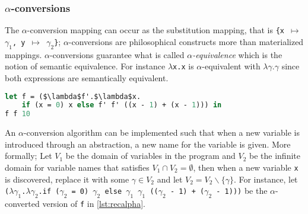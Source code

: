 \documentclass[11pt,oneside,a4paper]{report}
\begin{document}
\subsubsection{$\alpha$-conversions}
The $\alpha$-conversion mapping can occur as the substitution mapping, that is \texttt{\{x $\mapsto$ $\gamma_1$, y $\mapsto$ $\gamma_2$\}}; $\alpha$-conversions are philosophical constructs more than materialized mappings.
$\alpha$-conversions guarantee what is called \textit{$\alpha$-equivalence} which is the notion of semantic equivalence.
For instance \texttt{$\lambda$x.x} is $\alpha$-equivalent with \texttt{$\lambda\gamma.\gamma$} since both expressions are semantically equivalent.
\begin{lstlisting}[language=ML,caption={Recursive addition function},label={lst:recalpha},mathescape=true]
let f = ($\lambda$f'.$\lambda$x.
    if (x = 0) x else f' f' ((x - 1) + (x - 1))) in
f f 10
\end{lstlisting}
\noindent An $\alpha$-conversion algorithm can be implemented such that when a new variable is introduced through an abstraction, a new name for the variable is given.
More formally; Let $V_1$ be the domain of variables in the program and $V_2$ be the infinite domain for variable names that satisfies $V_1 \cap V_2 = \emptyset$, then when a new variable \texttt{x} is discovered, replace it with some $\gamma \in V_2$ and let $V_2 = V_2 \backslash \{\gamma\}$. 
For instance, let \texttt{($\lambda\gamma_1$.$\lambda\gamma_2$.if ($\gamma_2$ = 0) $\gamma_2$ else $\gamma_1$ $\gamma_1$ (($\gamma_2$ - 1) + ($\gamma_2$ - 1)))} be the $\alpha$-converted version of \texttt{f} in \autoref{lst:recalpha}.
\\
\end{document}

